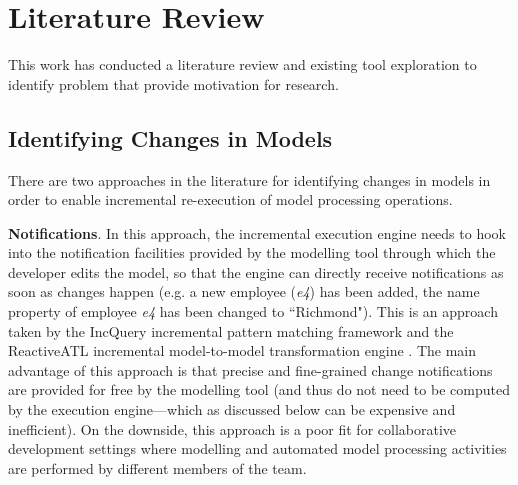 \chapter{Literature Review}
This work has conducted a literature review and existing tool exploration to 
identify problem that provide motivation for research. 

\section{Identifying Changes in Models}
\label{sec:identifying_changes_in models}
There are two approaches in the literature for identifying changes in models 
in order to enable incremental re-execution of model processing operations.

\textbf{Notifications}. In this approach, the incremental execution 
engine needs to hook into the notification facilities 
provided by the modelling tool through which the developer edits the model, 
so that the engine can directly receive notifications as soon as 
changes happen (e.g. a new employee (\emph{e4}) has been added, 
the name property of employee \emph{e4} has been changed to ``Richmond"). 
This is an approach taken by the IncQuery incremental pattern matching 
framework \cite{DBLP:conf/ecmdafa/RathHV12} and the ReactiveATL incremental model-to-model 
transformation engine \cite{DBLP:conf/ecmdafa/OgunyomiRK15}. The main advantage of this 
approach is that precise and fine-grained change notifications are provided 
for free by the modelling tool (and thus do not need to be computed by the 
execution engine---which as discussed below can be expensive and inefficient). 
On the downside, this approach is a poor fit for collaborative development 
settings where modelling and automated model processing activities are 
performed by different members of the team.

